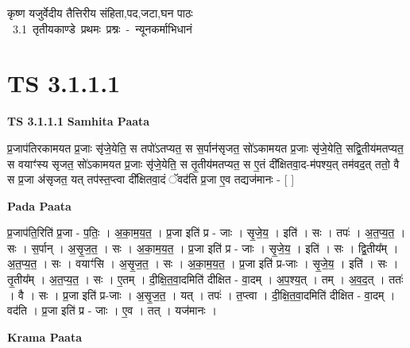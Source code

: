\documentclass[17pt]{extarticle}
\begin{document}
\begin{titlepage}
    \begin{center}
 
\begin{sanskrit}
    { \Large
    कृष्ण यजुर्वेदीय तैत्तिरीय संहिता,पद,जटा,घन पाठः 
    }
    \\
    \vspace{2.5cm}
    \mbox{ \Large
    3.1     तृतीयकाण्डे प्रथमः प्रश्नः - न्यूनकर्माभिधानं   }
\end{sanskrit}
\end{center}

\end{titlepage}
\tableofcontents
{}
\pagebreak


\section{ TS 3.1.1.1 }

\textbf{TS 3.1.1.1 } \newline
\textbf{Samhita Paata} \newline

प्र॒जाप॑तिरकामयत प्र॒जाः सृ॑जे॒येति॒ स तपो॑ऽतप्यत॒ स स॒र्पान॑सृजत॒ सो॑ऽकामयत प्र॒जाः सृ॑जे॒येति॒ सद्वि॒तीय॑मतप्यत॒ स वयाꣳ॑स्य सृजत॒ सो॑ऽकामयत प्र॒जाः सृ॑जे॒येति॒ स तृ॒तीय॑मतप्यत॒ स ए॒तं दी᳚क्षितवा॒द-म॑पश्य॒त् तम॑वद॒त् ततो॒ वै स प्र॒जा अ॑सृजत॒ यत् तप॑स्त॒प्त्वा दी᳚क्षितवा॒दं ॅवद॑ति प्र॒जा ए॒व तद्यज॑मानः - [  ] \newline

\textbf{Pada Paata} \newline

प्र॒जाप॑ति॒रिति॑ प्र॒जा - प॒तिः॒ । अ॒का॒म॒य॒त॒ । प्र॒जा इति॑ प्र - जाः । सृ॒जे॒य॒ । इति॑ । सः । तपः॑ । अ॒त॒प्य॒त॒ । सः । स॒र्पान् । अ॒सृ॒ज॒त॒ । सः । अ॒का॒म॒य॒त॒ । प्र॒जा इति॑ प्र - जाः । सृ॒जे॒य॒ । इति॑ । सः । द्वि॒तीय᳚म् । अ॒त॒प्य॒त॒ । सः । वयाꣳ॑सि । अ॒सृ॒ज॒त॒ । सः । अ॒का॒म॒य॒त॒ । प्र॒जा इति॑ प्र-जाः । सृ॒जे॒य॒ । इति॑ । सः । तृ॒तीय᳚म् । अ॒त॒प्य॒त॒ । सः । ए॒तम् । दी॒क्षि॒त॒वा॒दमिति॑ दीक्षित - वा॒दम् । अ॒प॒श्य॒त् । तम् । अ॒व॒द॒त् । ततः॑ । वै । सः । प्र॒जा इति॑ प्र-जाः । अ॒सृ॒ज॒त॒ । यत् । तपः॑ । त॒प्त्वा । दी॒क्षि॒त॒वा॒दमिति॑ दीक्षित - वा॒दम् । वद॑ति । प्र॒जा इति॑ प्र - जाः । ए॒व । तत् । यज॑मानः ।  \newline


\textbf{Krama Paata} \newline
\end{document}
